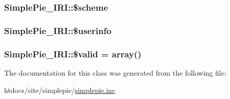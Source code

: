 \hypertarget{class_simple_pie___i_r_i_a0e1b44a9b51490d08453bda1df691dc2}{
\subsubsection[{\$scheme}]{\setlength{\rightskip}{0pt plus 5cm}Simple\-Pie\-\_\-\-I\-R\-I\-::\$scheme}}\label{class_simple_pie___i_r_i_a0e1b44a9b51490d08453bda1df691dc2}
\hypertarget{class_simple_pie___i_r_i_a82e760f9ca4d2c669c3f99028965c437}{
\subsubsection[{\$userinfo}]{\setlength{\rightskip}{0pt plus 5cm}Simple\-Pie\-\_\-\-I\-R\-I\-::\$userinfo}}\label{class_simple_pie___i_r_i_a82e760f9ca4d2c669c3f99028965c437}
\hypertarget{class_simple_pie___i_r_i_a78052707f955cde81112090626ae3708}{
\subsubsection[{\$valid}]{\setlength{\rightskip}{0pt plus 5cm}Simple\-Pie\-\_\-\-I\-R\-I\-::\$valid = array()}}\label{class_simple_pie___i_r_i_a78052707f955cde81112090626ae3708}


The documentation for this class was generated from the following file\-:\begin{DoxyCompactItemize}
\item 
htdocs/site/simplepie/\hyperlink{simplepie_8inc}{simplepie.\-inc}\end{DoxyCompactItemize}
